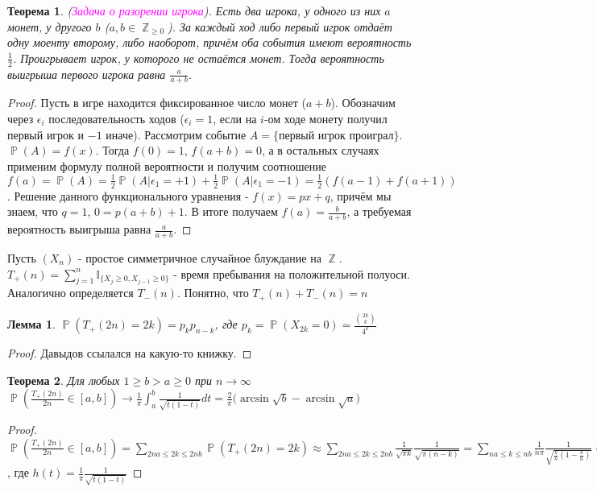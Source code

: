 \documentclass[a4paper,100pt]{article}
\theoremstyle{indented}
\newtheorem{theorem}{Теорема}
\newtheorem{lemma}{Лемма}
\theoremstyle{definition}
\theoremstyle{remark}
\DeclareMathOperator{\ZZ}{\mathbb{Z}}
\DeclareMathOperator{\PP}{\mathbb{P}}
\begin{document}
\begin{theorem}
  (\hypertarget{n44}{\textcolor{magenta}{\textit{Задача о разорении игрока}}}). Есть два игрока, у одного из них $a$ монет, у другого $b$ ($a, b \in \ZZ_{\geq 0}$). За каждый ход либо первый игрок отдаёт одну моенту второму, либо наоборот, причём оба события имеют вероятность $\frac{1}{2}$. Проигрывает игрок, у которого не остаётся монет. Тогда вероятность выигрыша первого игрока равна $\frac{a}{a+b}$.
\end{theorem}

\begin{proof}
  Пусть в игре находится фиксированное число монет ($a+b$). Обозначим через $\epsilon_i$ последовательность ходов ($\epsilon_i=1$, если на $i$-ом ходе монету получил первый игрок и $-1$ иначе). Рассмотрим событие $A=\{\text{первый игрок проиграл}\}$. $\PP(A)=f(x)$. Тогда $f(0)=1$, $f(a+b)=0$, а в остальных случаях применим формулу полной вероятности и получим соотношение $f(a)=\PP(A)=\frac{1}{2}\PP(A | \epsilon_1=+1)+\frac{1}{2}\PP(A | \epsilon_1=-1)=\frac{1}{2}(f(a-1)+f(a+1))$. Решение данного функционального уравнения - $f(x)=px+q$, причём мы знаем, что $q=1$, $0=p(a+b)+1$. В итоге получаем $f(a)=\frac{b}{a+b}$, а требуемая вероятность выигрыша равна $\frac{a}{a+b}$.
\end{proof}

Пусть $(X_n)$ - простое симметричное случайное блуждание на $\ZZ$. $T_+(n)=\sum_{j=1}^n \mathbb{I}_{\{X_j \geq 0, X_{j-1} \geq 0\}}$ - время пребывания на положительной полуоси. Аналогично определяется $T_-(n)$. Понятно, что $T_+(n)+T_-(n)=n$ 

\begin{lemma}
  $\PP(T_+(2n)=2k)=p_kp_{n-k}$, где $p_k=\PP(X_{2k}=0)=\frac{{2k\choose k}}{4^k}$
\end{lemma}

\begin{proof}
  Давыдов ссылался на какую-то книжку.
\end{proof}

\begin{theorem}
  Для любых $1\geq b>a\geq 0$ при $n \rightarrow \infty$ $\PP(\frac{T_+(2n)}{2n} \in [a, b]) \rightarrow \frac{1}{\pi} \int_{a}^b \frac{1}{\sqrt{t(1-t)}} dt=\frac{2}{\pi} \Big ( \arcsin{\sqrt{b}} - \arcsin{\sqrt{a}} \Big )$
\end{theorem}

\begin{proof}
  $\PP(\frac{T_+(2n)}{2n} \in [a, b])=\sum_{2na \leq 2k \leq 2nb} \PP(T_+(2n)=2k) \approx \sum_{2na \leq 2k \leq 2nb} \frac{1}{\sqrt{\pi k}} \frac{1}{\sqrt{\pi (n-k)}}=\sum_{na \leq k \leq nb} \frac{1}{n \pi} \frac{1}{\sqrt{\frac{k}{n}(1-\frac{k}{n})}}=\sum_{a \leq \frac{k}{n} \leq b} \frac{1}{n} h(\frac{k}{n}) \approx \int_a^bh(x) dx=\frac{2}{\pi} \Big ( \arcsin{\sqrt{b}} - \arcsin{\sqrt{a}} \Big )$, где $h(t)=\frac{1}{\pi}\frac{1}{\sqrt{t(1-t)}}$
\end{proof}
\end{document}
